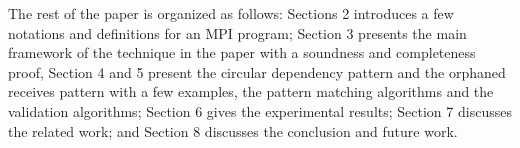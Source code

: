 The rest of the paper is organized as follows: Sections 2 introduces a few notations and definitions for an MPI program; Section 3 presents the main framework of the technique in the paper with a soundness and completeness proof, Section 4 and 5 present the circular dependency pattern and the orphaned receives pattern with a few examples, the pattern matching algorithms and the validation algorithms; Section 6 gives the experimental results; Section 7 discusses the related work; and Section 8 discusses the conclusion and future work.
